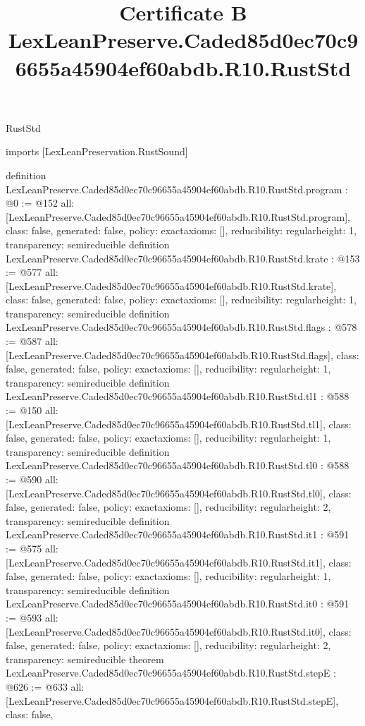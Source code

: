 \begin{lexlean}{RustStd}
\title{Certificate B LexLeanPreserve.Caded85d0ec70c96655a45904ef60abdb.R10.RustStd}
\begin{coremodule}
imports [LexLeanPreservation.RustSound]

definition LexLeanPreserve.Caded85d0ec70c96655a45904ef60abdb.R10.RustStd.program : @0 := @152 {
  all: [LexLeanPreserve.Caded85d0ec70c96655a45904ef60abdb.R10.RustStd.program],
  class: false,
  generated: false,
  policy: exact{axioms: []},
  reducibility: regular{height: 1},
  transparency: semireducible
}
definition LexLeanPreserve.Caded85d0ec70c96655a45904ef60abdb.R10.RustStd.krate : @153 := @577 {
  all: [LexLeanPreserve.Caded85d0ec70c96655a45904ef60abdb.R10.RustStd.krate],
  class: false,
  generated: false,
  policy: exact{axioms: []},
  reducibility: regular{height: 1},
  transparency: semireducible
}
definition LexLeanPreserve.Caded85d0ec70c96655a45904ef60abdb.R10.RustStd.flags : @578 := @587 {
  all: [LexLeanPreserve.Caded85d0ec70c96655a45904ef60abdb.R10.RustStd.flags],
  class: false,
  generated: false,
  policy: exact{axioms: []},
  reducibility: regular{height: 1},
  transparency: semireducible
}
definition LexLeanPreserve.Caded85d0ec70c96655a45904ef60abdb.R10.RustStd.tl1 : @588 := @150 {
  all: [LexLeanPreserve.Caded85d0ec70c96655a45904ef60abdb.R10.RustStd.tl1],
  class: false,
  generated: false,
  policy: exact{axioms: []},
  reducibility: regular{height: 1},
  transparency: semireducible
}
definition LexLeanPreserve.Caded85d0ec70c96655a45904ef60abdb.R10.RustStd.tl0 : @588 := @590 {
  all: [LexLeanPreserve.Caded85d0ec70c96655a45904ef60abdb.R10.RustStd.tl0],
  class: false,
  generated: false,
  policy: exact{axioms: []},
  reducibility: regular{height: 2},
  transparency: semireducible
}
definition LexLeanPreserve.Caded85d0ec70c96655a45904ef60abdb.R10.RustStd.it1 : @591 := @575 {
  all: [LexLeanPreserve.Caded85d0ec70c96655a45904ef60abdb.R10.RustStd.it1],
  class: false,
  generated: false,
  policy: exact{axioms: []},
  reducibility: regular{height: 1},
  transparency: semireducible
}
definition LexLeanPreserve.Caded85d0ec70c96655a45904ef60abdb.R10.RustStd.it0 : @591 := @593 {
  all: [LexLeanPreserve.Caded85d0ec70c96655a45904ef60abdb.R10.RustStd.it0],
  class: false,
  generated: false,
  policy: exact{axioms: []},
  reducibility: regular{height: 2},
  transparency: semireducible
}
theorem LexLeanPreserve.Caded85d0ec70c96655a45904ef60abdb.R10.RustStd.stepE : @626 := @633 {
  all: [LexLeanPreserve.Caded85d0ec70c96655a45904ef60abdb.R10.RustStd.stepE],
  class: false,
}
\end{coremodule}
\end{lexlean}
